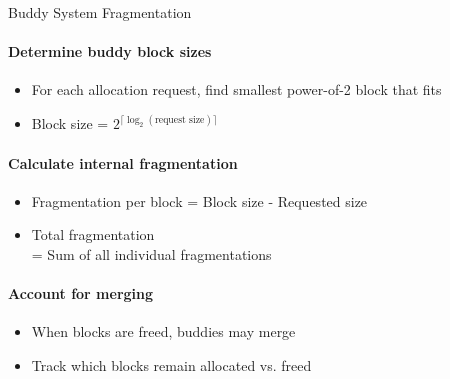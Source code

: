 \multend

\begin{KR}{Buddy System Fragmentation}
    \paragraph{Determine buddy block sizes}
    \begin{itemize}
        \item For each allocation request, find smallest power-of-2 block that fits
        \item Block size = $2^{\lceil \log_2(\text{request size}) \rceil}$
    \end{itemize}
   
    \paragraph{Calculate internal fragmentation}
    \begin{itemize}
        \item Fragmentation per block = Block size - Requested size
        \item Total fragmentation \\ = Sum of all individual fragmentations
    \end{itemize}   

    \paragraph{Account for merging}
    \begin{itemize}
        \item When blocks are freed, buddies may merge
        \item Track which blocks remain allocated vs. freed
    \end{itemize}
\end{KR}




